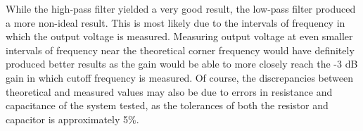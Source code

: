 While the high-pass filter yielded a very good result, the low-pass filter produced a more non-ideal result. This is most likely due to the intervals of frequency in which the output voltage is measured. Measuring output voltage at even smaller intervals of frequency near the theoretical corner frequency would have definitely produced better results as the gain would be able to more closely reach the -3 dB gain in which cutoff frequency is measured. Of course, the discrepancies between theoretical and measured values may also be due to errors in resistance and capacitance of the system tested, as the tolerances of both the resistor and capacitor is approximately 5\%. 